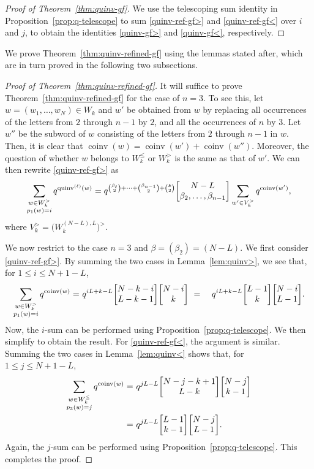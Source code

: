 \documentclass[ALCO,Unicode]{cedram}
\DeclareMathOperator{\coinv}{coinv}
\DeclareMathOperator{\quinvL}{\quinv^{(\ell)}}
\DeclareMathOperator{\quinv}{quinv}
\newcommand{\qbinom}[2]{\bgroup\renewcommand*{\arraystretch}{1}\begin{bmatrix} #1 \\ #2\end{bmatrix} \egroup}
\begin{document}
\begin{proof}[Proof of Theorem~\ref{thm:quinv-gf}]
We use the telescoping sum identity in Proposition~\ref{prop:q-telescope} to sum \eqref{quinv-ref-gf>} and \eqref{quinv-ref-gf<} over $i$ and $j$, to obtain the identities \eqref{quinv-gf>} and \eqref{quinv-gf<}, respectively.
\end{proof} 
We prove Theorem~\ref{thm:quinv-refined-gf} using the lemmas stated after, which are in turn
proved in the following two subsections. 
\begin{proof}[Proof of Theorem~\ref{thm:quinv-refined-gf}]
It will suffice to prove Theorem~\ref{thm:quinv-refined-gf} for the case of $n=3$. 
To see this, let $w = (w_1, \dots, w_N) \in W_k$ and $w'$ be obtained from $w$ by replacing all
occurrences of the letters from $2$ through $n-1$ by $2$, and all the occurrences of $n$ by $3$.
Let $w''$ be the subword of $w$ consisting of the letters from $2$ through $n-1$ in $w$. 
Then, it is clear that $\coinv(w) = \coinv(w') + \coinv(w'')$.  Moreover, the question of whether $w$
belongs to $W_k^\leq$ or $W_k^>$ is the same as that of $w'$. 
We can then rewrite \eqref{quinv-ref-gf>} as
\[
\sum_{\substack{ w \in W_k^> \\ p_1(w) = i}} q^{\quinvL(w)} =
q^{\binom{\beta_\ell}{2} + \cdots + \binom{\beta_{n-1}}{2} + \binom{k}{2}} 
\qbinom{N-L}{\beta_2,\dots,\beta_{n-1}}
\sum_{w'\in V_k^{>}} q^{\coinv(w')},
\]
where $V_k^> = \big(W^{(N-L),L}_k \big)^>$.


We now restrict to the case $n=3$ and $\beta = (\beta_2) = (N-L)$. 
We first consider \eqref{quinv-ref-gf>}.
By summing the two cases in Lemma~\ref{lem:quinv>}, we see that, for $1 \leq i \leq N +1 - L$,
\begin{align*}
\sum_{\substack{ w \in W_k^> \\ p_1(w) = i}} q^{\coinv(w)} 
=&\ q^{ iL + k - L} \qbinom{N-k-i}{L-k-1} \qbinom {N-i}k \
=&\ q^{ iL + k - L}  \qbinom{L-1}k \qbinom{N-i}{L-1}.
\end{align*}
Now, the $i$-sum can be performed using Proposition~\ref{prop:q-telescope}. We then simplify to obtain the result.
For \eqref{quinv-ref-gf<}, the argument is similar. Summing the two cases in Lemma~\ref{lem:quinv<}
shows that, for $1 \leq j \leq N +1 - L$,
\begin{align*}
\sum_{\substack{ w \in W_k^\leq \\ p_3(w) = j}} q^{\coinv(w)} 
=&\ q^{ j L - L} \qbinom{N-j-k+1}{L-k} \qbinom {N-j}{k-1} \\
=&\ q^{ j L - L} \qbinom{L-1}{k-1} \qbinom{N-j}{L-1}.
\end{align*}
Again, the $j$-sum can be performed using Proposition~\ref{prop:q-telescope}. This completes the proof.
\end{proof}
\end{document}
